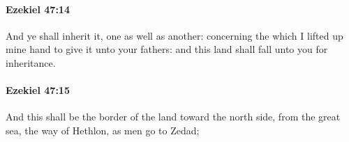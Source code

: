 		\paragraph{Ezekiel 47:14} %
			\label{EZEKIEL-47-14}

			And ye shall inherit it, one as well as another: concerning the which I lifted up mine hand to give it unto your fathers: and this land shall fall unto you for inheritance.


		\paragraph{Ezekiel 47:15} %
			\label{EZEKIEL-47-15}

			And this shall be the border of the land toward the north side, from the great sea, the way of Hethlon, as men go to Zedad;


